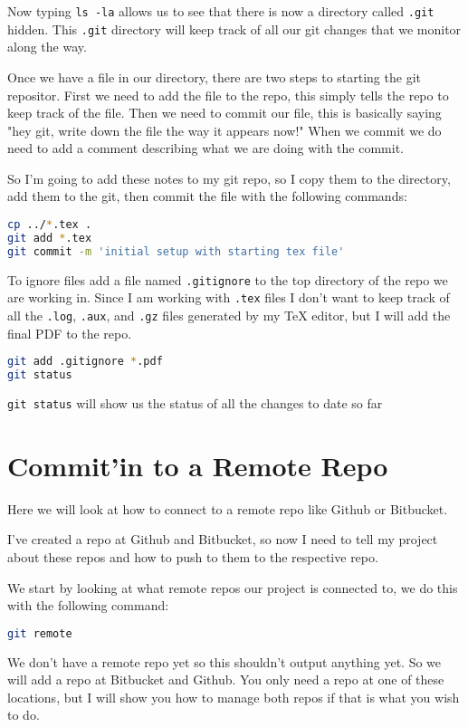 \documentclass[a4paper]{spie} %
\begin{document}
Now typing \texttt{ls -la} allows us to see that there is now a directory called \texttt{.git} hidden. This \texttt{.git} directory will keep track of all our git changes that we monitor along the way.

Once we have a file in our directory, there are two steps to starting the git repositor. First we need to add the file to the repo, this simply tells the repo to keep track of the file. Then we need to commit our file, this is basically saying "hey git, write down the file the way it appears now!" When we commit we do need to add a comment describing what we are doing with the commit.

So I'm going to add these notes to my git repo, so I copy them to the directory, add them to the git, then commit the file with the following commands:
\begin{lstlisting}[language=bash]
cp ../*.tex .
git add *.tex
git commit -m 'initial setup with starting tex file'
\end{lstlisting}



To ignore files add a file named \texttt{.gitignore} to the top directory of the repo we are working in. Since I am working with \texttt{.tex} files I don't want to keep track of all the \texttt{.log}, \texttt{.aux}, and \texttt{.gz} files generated by my TeX editor, but I will add the final PDF to the repo.
\begin{lstlisting}[language=bash]
git add .gitignore *.pdf
git status
\end{lstlisting}

\texttt{git status} will show us the status of all the changes to date so far



\section*{Commit'in to a Remote Repo}
Here we will look at how to connect to a remote repo like Github or Bitbucket. 

I've created a repo at Github and Bitbucket, so now I need to tell my project about these repos and how to push to them to the respective repo.

We start by looking at what remote repos our project is connected to, we do this with the following command:
\begin{lstlisting}[language=bash]
git remote
\end{lstlisting}

We don't have a remote repo yet so this shouldn't output anything yet. So we will add a repo at Bitbucket and Github. You only need a repo at one of these locations, but I will show you how to manage both repos if that is what you wish to do.
\end{document}
